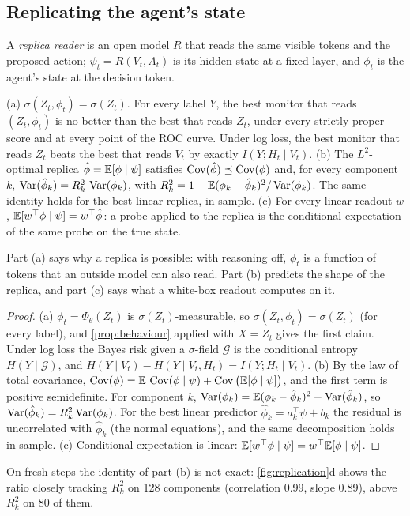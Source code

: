 \subsection{Replicating the agent's state}
\label{app:replica-theory}
A \emph{replica reader} is an open model $R$ that reads the same visible tokens and the proposed action; $\psi_t=R(V_t,A_t)$ is its hidden state at a fixed layer, and $\phi_t$ is the agent's state at the decision token.
\begin{proposition}\label{prop:replica}
(a) $\sigma(Z_t,\phi_t)=\sigma(Z_t)$. For every label $Y$, the best monitor that reads $(Z_t,\phi_t)$ is no better than the best that reads $Z_t$, under every strictly proper score and at every point of the ROC curve. Under log loss, the best monitor that reads $Z_t$ beats the best that reads $V_t$ by exactly $I(Y;H_t\mid V_t)$.
(b) The $L^2$-optimal replica $\hat\phi=\mathbb{E}[\phi\mid\psi]$ satisfies $\operatorname{Cov}(\hat\phi)\preceq\operatorname{Cov}(\phi)$ and, for every component $k$, $\operatorname{Var}(\hat\phi_k)=R^2_k\,\operatorname{Var}(\phi_k)$, with $R^2_k=1-\mathbb{E}(\phi_k-\hat\phi_k)^2/\operatorname{Var}(\phi_k)$. The same identity holds for the best linear replica, in sample.
(c) For every linear readout $w$, $\mathbb{E}[w^\top\phi\mid\psi]=w^\top\hat\phi$: a probe applied to the replica is the conditional expectation of the same probe on the true state.
\end{proposition}
Part (a) says why a replica is possible: with reasoning off, $\phi_t$ is a function of tokens that an outside model can also read. Part (b) predicts the shape of the replica, and part (c) says what a white-box readout computes on it.
\begin{proof}
(a) $\phi_t=\Phi_\theta(Z_t)$ is $\sigma(Z_t)$-measurable, so $\sigma(Z_t,\phi_t)=\sigma(Z_t)$ (for every label), and \cref{prop:behaviour} applied with
$X=Z_t$ gives the first claim. Under log loss the Bayes risk given a $\sigma$-field $\mathcal G$ is the conditional entropy
$H(Y\mid\mathcal G)$, and $H(Y\mid V_t)-H(Y\mid V_t,H_t)=I(Y;H_t\mid V_t)$.
(b) By the law of total covariance, $\operatorname{Cov}(\phi)=\mathbb{E}\,\operatorname{Cov}(\phi\mid\psi)+\operatorname{Cov}\big(\mathbb{E}[\phi\mid\psi]\big)$, and the first term is positive
semidefinite. For component $k$, $\operatorname{Var}(\phi_k)=\mathbb{E}(\phi_k-\hat\phi_k)^2+\operatorname{Var}(\hat\phi_k)$, so $\operatorname{Var}(\hat\phi_k)=R^2_k\operatorname{Var}(\phi_k)$. For the
best linear predictor $\hat\phi_k=a_k^\top\psi+b_k$ the residual is uncorrelated with $\hat\phi_k$ (the normal equations), and
the same decomposition holds in sample.
(c) Conditional expectation is linear: $\mathbb{E}[w^\top\phi\mid\psi]=w^\top\mathbb{E}[\phi\mid\psi]$.
\end{proof}
On fresh steps the identity of part (b) is not exact: \cref{fig:replication}d shows the ratio
closely tracking $R^2_k$ on 128 components (correlation 0.99, slope 0.89), above $R^2_k$ on 80 of them.

